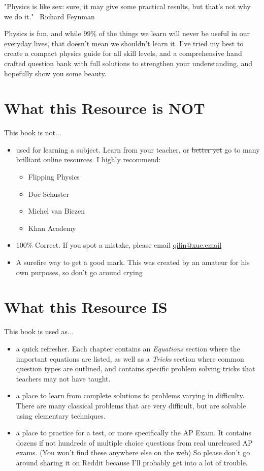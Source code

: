 "Physics is like sex: sure, it may give some practical results, but that's not why we do it." ~Richard Feynman

Physics is fun, and while 99\% of the things we learn will never be useful in our everyday lives, that doesn't mean we shouldn't learn it. I've tried my best to create a compact physics guide for all skill levels, and a comprehensive hand crafted question bank with full solutions to strengthen your understanding, and hopefully show you some beauty.

\section*{What this Resource is NOT}

This book is not...
\begin{itemize}
    \item used for learning a subject. Learn from your teacher, or \sout{better yet} go to many brilliant online resources. I highly recommend:
    \begin{itemize}
        \item Flipping Physics
        \item Doc Schuster
        \item Michel van Biezen
        \item Khan Academy
    \end{itemize}
    \item 100\% Correct. If you spot a mistake, please email \href{mailto:qilin@xue.email}{qilin@xue.email}
    \item A surefire way to get a good mark. This was created by an amateur for his own purposes, so don't go around crying
\end{itemize}
\newpage
\section*{What this Resource IS}
This book is used as...
\begin{itemize}
    \item a quick refresher. Each chapter contains an \emph{Equations} section where the important equations are listed, as well as a \emph{Tricks} section where common question types are outlined, and contains specific problem solving tricks that teachers may not have taught.
    \item a place to learn from complete solutions to problems varying in difficulty. There are many classical problems that are very difficult, but are solvable using elementary techniques.
    \item a place to practice for a test, or more specifically the AP Exam. It contains dozens if not hundreds of multiple choice questions from real unreleased AP exams. (You won't find these anywhere else on the web) So please don't go around sharing it on Reddit because I'll probably get into a lot of trouble.
\end{itemize}